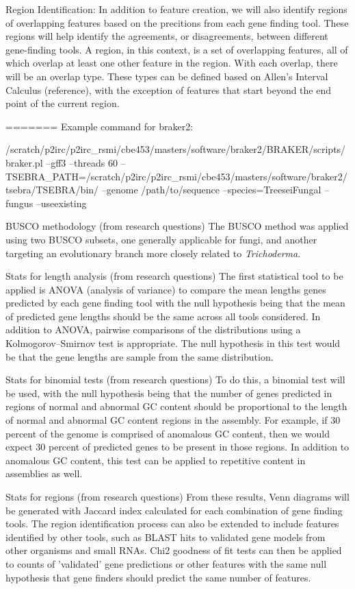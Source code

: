 Region Identification: In addition to feature creation, we will also
identify regions of overlapping features based on the precitions from
each gene finding tool. These regions will help identify the
agreements, or disagreements, between different gene-finding tools. A
region, in this context, is a set of overlapping features, all of
which overlap at least one other feature in the region. With each
overlap, there will be an overlap type. These types can be defined
based on Allen's Interval Calculus (reference), with the exception of
features that start beyond the end point of the current region.

=======
Example command for braker2:

/scratch/p2irc/p2irc\_rsmi/cbe453/masters/software/braker2/BRAKER/scripts/braker.pl
--gff3 --threads 60
--TSEBRA\_PATH=/scratch/p2irc/p2irc\_rsmi/cbe453/masters/software/braker2/tsebra/TSEBRA/bin/
--genome /path/to/sequence --species=TreeseiFungal --fungus
--useexisting

BUSCO methodology (from research questions)
The BUSCO method was applied using two BUSCO subsets,
one generally applicable for fungi, and another targeting an
evolutionary branch more closely related to \textit{Trichoderma}.

Stats for length analysis (from research questions)
The first statistical tool to be applied is ANOVA (analysis of
variance) to compare the mean lengths genes predicted by each gene
finding tool with the null hypothesis being that the mean of predicted
gene lengths should be the same across all tools considered. In
addition to ANOVA, pairwise comparisons of the distributions using a
Kolmogorov–Smirnov test is appropriate. The null hypothesis in this
test would be that the gene lengths are sample from the same
distribution.

Stats for binomial tests (from research questions)
To do this, a binomial test will be used, with the null hypothesis
being that the number of genes predicted in regions of normal and
abnormal GC content should be proportional to the length of normal and
abnormal GC content regions in the assembly. For example, if 30
percent of the genome is comprised of anomalous GC content, then we
would expect 30 percent of predicted genes to be present in those
regions. In addition to anomalous GC content, this test can be applied
to repetitive content in assemblies as well.

Stats for regions (from research questions)
From these results, Venn diagrams will be generated with
Jaccard index calculated for each combination of gene finding
tools. The region identification process can also be extended to
include features identified by other tools, such as BLAST hits to
validated gene models from other organisms and small RNAs. Chi2
goodness of fit tests can then be applied to counts of 'validated'
gene predictions or other features with the same null hypothesis that
gene finders should predict the same number of features.
